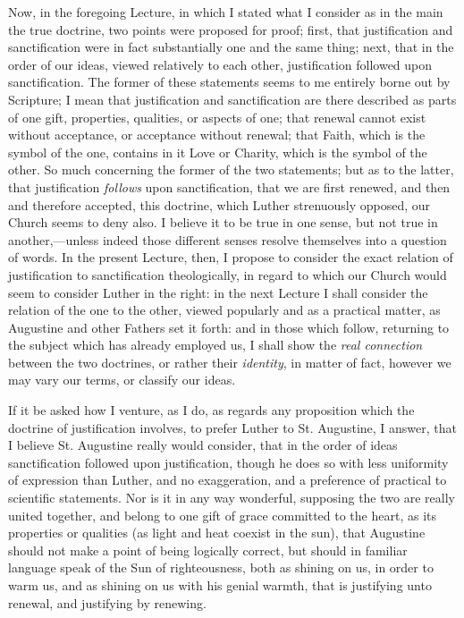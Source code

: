 Now, in the foregoing Lecture, in which I stated what I consider as
in the main the true doctrine, two points were proposed for proof;
first, that justification and sanctification were in fact
substantially one and the same thing; next, that in the order of our
ideas, viewed relatively to each other, justification followed upon
sanctification. The former of these statements seems to me entirely
borne out by Scripture; I mean that justification and sanctification
are there described as parts of one gift, properties, qualities, or
aspects of one; that renewal cannot exist without acceptance, or
acceptance without renewal; that Faith, which is the symbol of the
one, contains in it Love or Charity, which is the symbol of the other.
So much concerning the former of the two statements; but as to the
latter, that justification \emph{follows} upon sanctification, that we
are first renewed, and then and therefore accepted, this doctrine,
which Luther strenuously opposed, our Church seems to deny also. I
believe it to be true in one sense, but not true in another,—unless
indeed those different senses resolve themselves into a question
of words. In the present Lecture, then, I propose to consider the
exact relation of justification to sanctification theologically, in
regard to which our Church would seem to consider Luther in the right:
in the next Lecture I shall consider the relation of the one to the
other, viewed popularly and as a practical matter, as Augustine and
other Fathers set it forth: and in those which follow, returning to
the subject which has already employed us, I shall show the \emph{real
connection} between the two doctrines, or rather their \emph{identity},
in matter of fact, however we may vary our terms, or classify our
ideas.

If it be asked how I venture, as I do, as regards any proposition
which the doctrine of justification involves, to prefer Luther to St.
Augustine, I answer, that I believe St. Augustine really would
consider, that in the order of ideas sanctification followed upon
justification, though he does so with less uniformity of expression
than Luther, and no exaggeration, and a preference of practical to
scientific statements. Nor is it in any way wonderful, supposing the
two are really united together, and belong to one gift of grace
committed to the heart, as its properties or qualities (as light and
heat coexist in the sun), that Augustine should not make a point of
being logically correct, but should in familiar language speak of the
Sun of righteousness, both as shining on us, in order to warm us, and
as shining on us with his genial warmth, that is justifying unto
renewal, and justifying by renewing.

